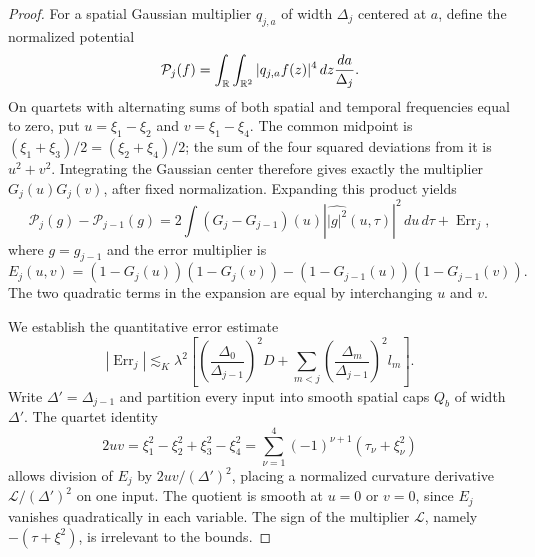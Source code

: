 \begin{proof}
For a spatial Gaussian multiplier $q_{j,a}$ of width $\Delta_j$
centered at $a$, define the normalized potential
\[
 \mathcal P_j(f)=\int_\mathbb R\int_{\mathbb R^2}|q_{j,a}f(z)|^4\,dz
                                      \frac{da}{\Delta_j}.
\]
On quartets with alternating sums of both spatial and temporal
frequencies equal to zero, put
$u=\xi_1-\xi_2$ and $v=\xi_1-\xi_4$.
The common midpoint is
$(\xi_1+\xi_3)/2=(\xi_2+\xi_4)/2$; the sum of the four squared
deviations from it is $u^2+v^2$.  Integrating the Gaussian center
therefore gives exactly the multiplier $G_j(u)G_j(v)$, after fixed
normalization.  Expanding this product yields
\begin{equation}\label{eq:frame-potential-increment}
 \mathcal P_j(g)-\mathcal P_{j-1}(g)
 =2\int(G_j-G_{j-1})(u)
                |\widehat{|g|^2}(u,\tau)|^2\,du\,d\tau
    +\operatorname{Err}_j,
\end{equation}
where $g=g_{j-1}$ and the error multiplier is
\[
 E_j(u,v)=(1-G_j(u))(1-G_j(v))
                 -(1-G_{j-1}(u))(1-G_{j-1}(v)).
\]
The two quadratic terms in the expansion are equal by interchanging
$u$ and $v$.

We establish the quantitative error estimate
\begin{equation}\label{eq:src21}
 |\operatorname{Err}_j|\lesssim_K\lambda^2
 \left[\left(\frac{\Delta_0}{\Delta_{j-1}}\right)^2D+
 \sum_{m<j}\left(\frac{\Delta_m}{\Delta_{j-1}}\right)^2l_m\right].
\end{equation}
Write $\Delta'=\Delta_{j-1}$ and partition every input into smooth
spatial caps $Q_b$ of width $\Delta'$.  The quartet identity
\begin{equation}\label{eq:frame-quartet}
 2uv=\xi_1^2-\xi_2^2+\xi_3^2-\xi_4^2
     =\sum_{\nu=1}^4(-1)^{\nu+1}(\tau_\nu+\xi_\nu^2)
\end{equation}
allows division of $E_j$ by $2uv/(\Delta')^2$, placing a normalized
curvature derivative $\mathcal L/(\Delta')^2$ on one input.
The quotient is smooth at $u=0$ or $v=0$, since $E_j$ vanishes
quadratically in each variable.  The sign of the multiplier
$\mathcal L$, namely $-(\tau+\xi^2)$, is irrelevant to the bounds.


\end{proof}

